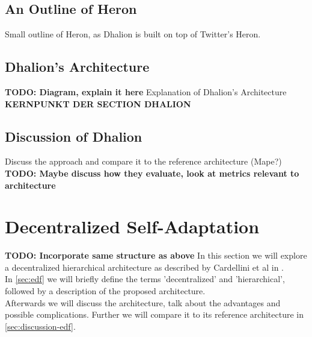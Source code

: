         \subsection{An Outline of Heron}
        \label{sub:heron-outline}
        Small outline of Heron, as Dhalion is built on top of Twitter's Heron.

        \subsection{Dhalion's Architecture}
        \label{sec:dhalion-architecture}
        \textbf{TODO: Diagram, explain it here}
        Explanation of Dhalion's Architecture \textbf{KERNPUNKT DER SECTION DHALION}

        \subsection{Discussion of Dhalion}
        \label{sec:dhalion-discussion}
        Discuss the approach and compare it to the reference architecture (Mape?)
        \textbf{TODO: Maybe discuss how they evaluate, look at metrics relevant to architecture}

    \section{Decentralized Self-Adaptation}
    \label{sec:hierarchical}
    \textbf{TODO: Incorporate same structure as above}
    In this section we will explore a decentralized hierarchical architecture as described by Cardellini et al in \cite{cardellini}.
    \\
    In \ref{sec:edf} we will briefly define the terms 'decentralized' and 'hierarchical', followed by a description of the proposed architecture.
    \\
    Afterwards we will discuss the architecture, talk about the advantages and possible complications. Further we will compare it to its reference architecture in \ref{sec:discussion-edf}.



